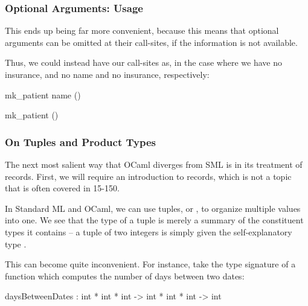 \documentclass[aspectratio=169, handout]{beamer}
\begin{document}
\begin{frame}[fragile]
  \frametitle{Optional Arguments: Usage}

  This ends up being far more convenient, because this means that optional
  arguments can be omitted at their call-sites, if the information is not
  available.

  \vspace{\fill}

  Thus, we could instead have our call-sites as, in the case where we have
  no insurance, and no name and no insurance, respectively:

  \vspace{\fill}

  \begin{codeblock}
    mk_patient name ()
  \end{codeblock}

  \vspace{\fill}

  \begin{codeblock}
    mk_patient ()
  \end{codeblock}
\end{frame}


\begin{frame}[fragile]
  \frametitle{On Tuples and Product Types}

  The next most salient way that OCaml diverges from SML is in its treatment of
  records. First, we will require an introduction to records, which is not a
  topic that is often covered in 15-150.

  \vspace{\fill}

  In Standard ML and OCaml, we can use tuples, or , to organize
  multiple values into one. We see that the type of a tuple is merely a summary of
  the constituent types it contains -- a tuple of two integers is simply given the
  self-explanatory type .

  \vspace{\fill}

  This can become quite inconvenient. For instance, take the type signature of a
  function which computes the number of days between two dates:

  \vspace{\fill}

  \begin{codeblock}
    daysBetweenDates : int * int * int -> int * int * int -> int
  \end{codeblock}
\end{frame}
\end{document}
